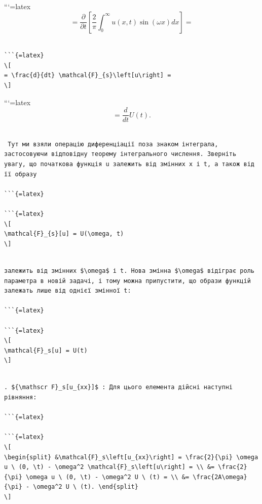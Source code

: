 \documentclass[
]{article}
\begin{document}
```{=latex}
\[
= \frac{\partial}{\partial t} \left[\frac{2}{\pi} \int_{0}^{\infty} u\left(x, t\right) \sin\left(\omega x\right) dx\right] =
\]

\begin{verbatim}

```{=latex}
\[
= \frac{d}{dt} \mathcal{F}_{s}\left[u\right] =
\]
\end{verbatim}

```{=latex}
\[
= \frac{d}{dt} U\left(t\right).
\]

\begin{verbatim}

 Тут ми взяли операцію диференціації поза знаком інтеграла, застосовуючи відповідну теорему інтегрального числення. Зверніть увагу, що початкова функція u залежить від змінних x і t, а також від її образу

```{=latex}

```{=latex}
\[
\mathcal{F}_{s}[u] = U(\omega, t)
\]
\end{verbatim}

\begin{verbatim}

залежить від змінних $\omega$ і t. Нова змінна $\omega$ відіграє роль параметра в новій задачі, і тому можна припустити, що образи функцій залежать лише від однієї змінної t:

```{=latex}

```{=latex}
\[
\mathcal{F}_s[u] = U(t)
\]
\end{verbatim}

\begin{verbatim}

. ${\mathscr F}_s[u_{xx}]$ : Для цього елемента дійсні наступні рівняння:

```{=latex}

```{=latex}
\[
\begin{split} &\mathcal{F}_s\left[u_{xx}\right] = \frac{2}{\pi} \omega u \ (0, \t) - \omega^2 \mathcal{F}_s\left[u\right] = \\ &= \frac{2}{\pi} \omega u \ (0, \t) - \omega^2 U \ (t) = \\ &= \frac{2A\omega}{\pi} - \omega^2 U \ (t). \end{split}
\]
\end{verbatim}
\end{document}
